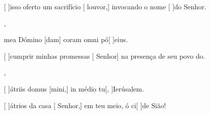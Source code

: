 {    {\item {}[ ]{is}so oferto um sacrifício [ louvor,] invocando o nome [ ]{do} Senhor.~\Antiphona},
  {\item {} mea Dómino [dam] coram omni pó[ ]{e}ius.~\Antiphona}%
    {\item {}[ ]{cum}prir minhas promessas [ Senhor] na presença de seu povo do.~\Antiphona},
  {\item {}[ ]{á}triis domus [mini,] in médio tu[, ]{Ie}{rú}salem.~\Antiphona}%
    {\item {}[ ]{á}trios da casa [ Senhor,] em teu meio, ó ci[ ]{de} Sião!~\Antiphona}
}